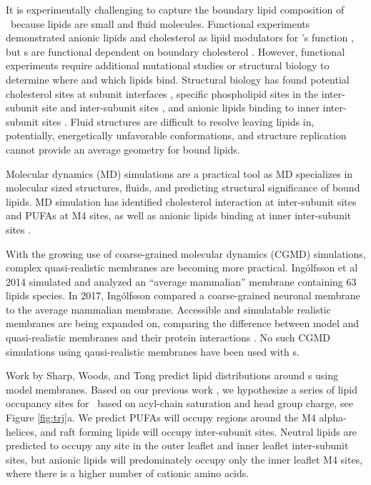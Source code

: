 It is experimentally challenging to capture the boundary lipid composition of \plgic~because lipids are small and fluid molecules. Functional experiments demonstrated anionic lipids and cholesterol as lipid modulators for \plgic's function  \cite{Ellena1983,Fong1986,Fong1987,Jones1988,Sunshine1994,DaCosta2009b}, but \plgic s are functional dependent on boundary cholesterol \cite{Dalziel1980,Addona1998,M.CriadoH.Eibl1982}. However, functional experiments require additional mutational studies or structural biology to determine where and which lipids bind. Structural biology has found potential cholesterol sites at subunit interfaces \cite{Laverty2017, Budelier2019}, specific phospholipid sites in the inter-subunit site \cite{Henault2019,Basak2017} and inter-subunit sites \cite{Kim2020}, and anionic lipids binding to inner inter-subunit sites \cite{Tong2019}. Fluid structures are difficult to resolve leaving lipids in, potentially, energetically unfavorable conformations, and structure replication cannot provide an average geometry for bound lipids.

Molecular dynamics (MD) simulations are a practical tool as MD specializes in molecular sized structures, fluids, and predicting structural significance of bound lipids. MD simulation has identified cholesterol \cite{Brannigan2008} interaction at inter-subunit sites and PUFAs at M4 sites\cite{Woods2019}, as well as anionic lipids binding at inner inter-subunit sites \cite{Tong2019}. 

With the growing use of coarse-grained molecular dynamics (CGMD) simulations, complex quasi-realistic membranes are becoming more practical. Ing{\'o}lfsson et al 2014 simulated and analyzed an ``average mammalian'' membrane containing 63 lipids species. In 2017, Ing{\'o}lfsson compared a coarse-grained neuronal membrane\cite{Ingolfsson2017b} to the average mammalian membrane. Accessible and simulatable realistic membranes are being expanded on, comparing the difference between model and quasi-realistic membranes and their protein interactions \cite{Marrink2019,Wilson2020,Ingolfsson2020,Carpenter2018,Lorent2019}. No such CGMD simulations using qausi-realistic membranes have been used with \plgic s.

Work by Sharp\cite{Sharp2019}, Woods\cite{Woods2019}, and Tong\cite{Tong2019} predict lipid distributions around \plgic s using model membranes. Based on our previous work \cite{Sharp2019, Woods2019, Tong2019}, we hypothesize a series of lipid occupancy sites for \nachr~based on acyl-chain saturation and head group charge, see Figure \ref{fig:trj}a. We predict PUFAs will occupy regions around the M4 alpha-helices, and raft forming lipids will occupy inter-subunit sites. Neutral lipids are predicted to occupy any site in the outer leaflet and inner leaflet inter-subunit sites, but anionic lipids will predominately occupy only the inner leaflet M4 sites, where there is a higher number of cationic amino acids.

